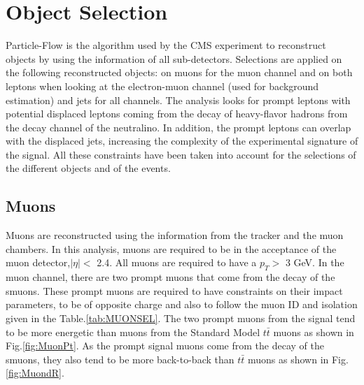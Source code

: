 \documentclass{cernatlasnote}
\begin{document}
\section{Object Selection}
\label{SEC: OBJSEL}
    Particle-Flow \cite{CMS:2017yfk} is the algorithm used by the CMS experiment to reconstruct objects by using the information of all sub-detectors. Selections are applied on the following reconstructed objects: on muons for the muon channel and on both leptons when looking at the electron-muon channel (used for background estimation) and jets for all channels. The analysis looks for prompt leptons with potential displaced leptons coming from the decay of heavy-flavor hadrons from the decay channel of the neutralino. In addition, the prompt leptons can overlap with the displaced jets, increasing the complexity of the experimental signature of the signal. All these constraints have been taken into account for the selections of the different objects and of the events.
    \subsection{Muons}
        Muons are reconstructed using the information from the tracker and the muon chambers. In this analysis, muons are required to be in the acceptance of the muon detector,$|\eta| <$ 2.4. All muons are required to have a $p_T > $  3 GeV. In the muon channel, there are two prompt muons that come from the decay of the smuons. These prompt muons are required to have constraints on their impact parameters, to be of opposite charge and also to follow the muon ID and isolation given in the Table.\ref{tab:MUONSEL}. The two prompt muons from the signal tend to be more energetic than muons from the Standard Model $t\bar{t}$ muons as shown in Fig.\ref{fig:MuonPt}. As the prompt signal muons come from the decay of the smuons, they also tend to be more back-to-back than $t\bar{t}$ muons as shown in Fig.\ref{fig:MuondR}.
\end{document}
